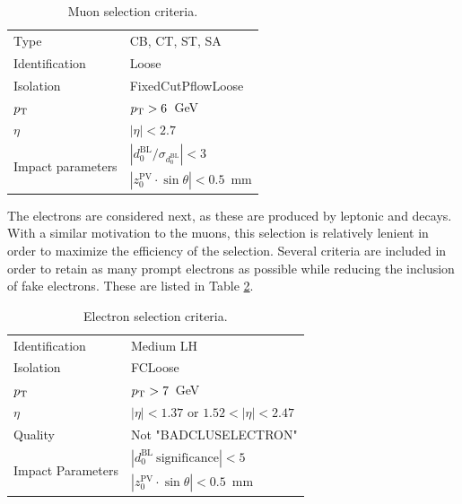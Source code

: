 \begin{table}[H]
    \begin{center}
        \begin{tabular}{ll}
            \toprule
            Type            &CB, CT, ST, SA\\
            Identification  &Loose \\
            Isolation       &FixedCutPflowLoose\\
            $p_\text{T}$           &$p_\text{T} > 6$~GeV\\
            $\eta$          &$|\eta| < 2.7$\\
            \multirow{2}{*}{Impact parameters}   &$|d_0^{\mathrm{BL}}/\sigma_{d_0^{\mathrm{BL}}}| < 3$\\
            &$|z_0^{\mathrm{PV}}\cdot \sin{\theta}| < 0.5$~mm\\
            \bottomrule
        \end{tabular}
        \caption{Muon selection criteria.}
        \label{tab:hmmMuonObjSel}
    \end{center}
\end{table}

The electrons are considered next, as these are produced by leptonic \W and \Z decays.
With a similar motivation to the muons, this selection is relatively lenient in order to maximize the efficiency of the selection.
Several criteria are included in order to retain as many prompt electrons as possible while reducing the inclusion of fake electrons.
These are listed in Table \ref{tab:hmmEleObjSel}.

\begin{table}[H]
    \begin{center}
        \begin{tabular}{ll}
            \toprule
            Identification    &Medium LH\\
            Isolation        &FCLoose\\
            $p_\text{T}$            &$p_\text{T} > 7$~GeV\\
            $\eta$            & $|\eta|<1.37$ or $1.52<|\eta|<2.47$ \\
            Quality            &Not "BADCLUSELECTRON"\\
            \multirow{2}{*}{Impact Parameters}    & $|d_0^{\mathrm{BL}}\ \mathrm{significance}|<5$ \\
            &$|z_0^{\mathrm{PV}} \cdot \sin{\theta}| < 0.5$~mm\\
            \bottomrule
        \end{tabular}
        \caption{Electron selection criteria.}
        \label{tab:hmmEleObjSel}
    \end{center}
\end{table}

